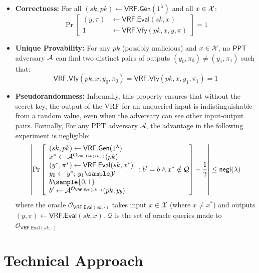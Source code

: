 \begin{itemize}
    \item \textbf{Correctness:} For all $(sk, pk) \gets \mathsf{VRF.Gen}(1^\lambda)$ and all $x \in \mathcal{X}$:
    \[
    \Pr\left[\begin{aligned}
        (y, \pi) &\gets \mathsf{VRF.Eval}(sk, x) \\
        1 &\gets \mathsf{VRF.Vfy}(pk, x, y, \pi)
    \end{aligned}\right] = 1
    \]

    \item \textbf{Unique Provability:} For any $pk$ (possibly malicious) and $x \in \mathcal{X}$, no $\mathsf{PPT}$ adversary $\mathcal{A}$ can find two distinct pairs of outputs $(y_0, \pi_0) \neq (y_1, \pi_1)$ such that:
    \[
    \mathsf{VRF.Vfy}(pk, x, y_0, \pi_0) = \mathsf{VRF.Vfy}(pk, x, y_1, \pi_1) = 1
    \]

    \item \textbf{Pseudorandomness:} Informally, this property ensures that without the secret key, the output of the VRF for an unqueried input is indistinguishable from a random value, even when the adversary can see other input-output pairs.
    Formally, For any PPT adversary $\mathcal{A}$, the advantage in the following experiment is negligible:
    \[
    \left|\Pr\left[\begin{array}{l}
        (sk, pk) \gets \mathsf{VRF.Gen}(1^\lambda) \\
        x^* \gets \mathcal{A}^{\mathcal{O}_{\mathsf{VRF.Eval}(sk, \cdot)}}(pk) \\
        (y^*, \pi^*) \gets \mathsf{VRF.Eval}(sk, x^*) \\
        y_0 \gets y^*; \, y_1 \sample \mathcal{Y} \\
        b \sample \{0,1\} \\
        b' \gets \mathcal{A}^{\mathcal{O}_{\mathsf{VRF.Eval}(sk, \cdot)}}(pk, y_b)
    \end{array} : b' = b \wedge x^* \notin \mathcal{Q}\right] - \frac{1}{2}\right| \leq \negl(\lambda)
    \]
    where the oracle $\mathcal{O}_{\mathsf{VRF.Eval}(sk, \cdot)}$ takes input $x \in \mathcal{X}$ (where $x \neq x^*$) and outputs $(y, \pi) \gets \mathsf{VRF.Eval}(sk, x)$. $\mathcal{Q}$ is the set of oracle queries made to $\mathcal{O}_{\mathsf{VRF.Eval}(sk, \cdot)}$  
\end{itemize}








\section{Technical Approach}

